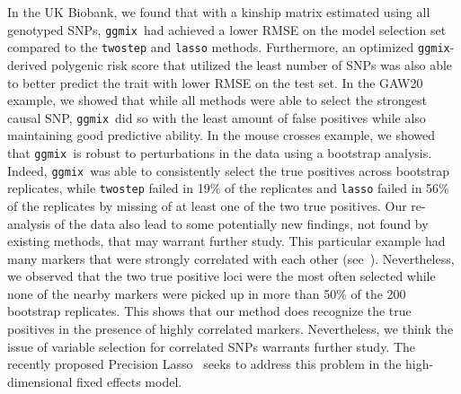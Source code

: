 \documentclass[10pt,letterpaper]{article}
\newcommand{\ggmix}{\texttt{ggmix}}
\begin{document}
		In the UK Biobank, we found that with a kinship matrix estimated using all genotyped SNPs, \ggmix ~had achieved a lower RMSE on the model selection set compared to the \texttt{twostep} and \texttt{lasso} methods. Furthermore, an optimized \ggmix-derived polygenic risk score that utilized the least number of SNPs was also able to better predict the trait with lower RMSE on the test set.
		In the GAW20 example, we showed that while all methods were able to select the strongest causal SNP, \ggmix ~did so with the least amount of false positives while also maintaining good predictive ability. In the mouse crosses example, we showed that \ggmix ~is robust to perturbations in the data using a bootstrap analysis. Indeed, \ggmix ~was able to consistently select the true positives across bootstrap replicates, while \texttt{twostep} failed in 19\% of the replicates and \texttt{lasso} failed in 56\% of the replicates by missing of at least one of the two true positives. Our re-analysis of the data also lead to some potentially new findings, not found by existing methods, that may warrant further study. This particular example had many markers that were strongly correlated with each other (see~). Nevertheless, we observed that the two true positive loci were the most often selected while none of the nearby markers were picked up in more than 50\% of the 200 bootstrap replicates. This shows that our method does recognize the true positives in the presence of highly correlated markers. Nevertheless, we think the issue of variable selection for correlated SNPs warrants further study. The recently proposed Precision Lasso~\cite{wang2018precision} seeks to address this problem in the high-dimensional fixed effects model.
		
\end{document}
